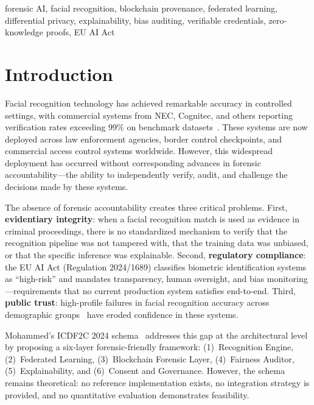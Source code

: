 \documentclass[conference]{IEEEtran}
\begin{document}
\begin{IEEEkeywords}
forensic AI, facial recognition, blockchain provenance, federated learning, differential privacy, explainability, bias auditing, verifiable credentials, zero-knowledge proofs, EU AI Act
\end{IEEEkeywords}

\section{Introduction}

Facial recognition technology has achieved remarkable accuracy in controlled settings, with commercial systems from NEC, Cognitec, and others reporting verification rates exceeding 99\% on benchmark datasets~\cite{grother2019frvt}. These systems are now deployed across law enforcement agencies, border control checkpoints, and commercial access control systems worldwide. However, this widespread deployment has occurred without corresponding advances in forensic accountability---the ability to independently verify, audit, and challenge the decisions made by these systems.

The absence of forensic accountability creates three critical problems. First, \textbf{evidentiary integrity}: when a facial recognition match is used as evidence in criminal proceedings, there is no standardized mechanism to verify that the recognition pipeline was not tampered with, that the training data was unbiased, or that the specific inference was explainable. Second, \textbf{regulatory compliance}: the EU AI Act (Regulation 2024/1689) classifies biometric identification systems as ``high-risk'' and mandates transparency, human oversight, and bias monitoring---requirements that no current production system satisfies end-to-end. Third, \textbf{public trust}: high-profile failures in facial recognition accuracy across demographic groups~\cite{buolamwini2018gender} have eroded confidence in these systems.

Mohammed's ICDF2C 2024 schema~\cite{mohammed2024forensic} addresses this gap at the architectural level by proposing a six-layer forensic-friendly framework: (1)~Recognition Engine, (2)~Federated Learning, (3)~Blockchain Forensic Layer, (4)~Fairness Auditor, (5)~Explainability, and (6)~Consent and Governance. However, the schema remains theoretical: no reference implementation exists, no integration strategy is provided, and no quantitative evaluation demonstrates feasibility.
\end{document}

